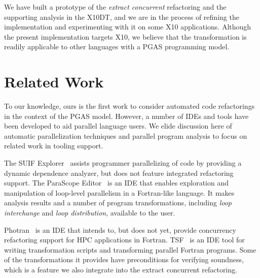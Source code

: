 \documentclass[natbib]{sigplanconf}
\begin{document}
We have built a prototype of the {\em extract concurrent} 
refactoring and the supporting analysis
in the X10DT, and we are in the process of refining the
implementation and experimenting with it on some X10 applications. 
Although the present implementation targets X10, we believe that the
transformation is readily applicable to other languages with a PGAS
programming model.

\section{Related Work}
\label{sec:related}

To our knowledge, ours is the first work to consider automated code
refactorings in the context of the PGAS model.  However,
a number of IDEs and
tools have been developed to aid parallel language users. 
We elide discussion here of automatic parallelization
techniques and parallel program analysis to focus on related work in tooling
support.

The SUIF Explorer~\cite{Liao99} assists programmer parallelizing of
code by providing a dynamic dependence analyzer, but does not feature
integrated refactoring support. The ParaScope Editor~\cite{Kennedy91} is an IDE that
enables exploration and manipulation of
loop-level parallelism in a Fortran-like language. It makes
analysis results and a number of program transformations, including {\em loop
interchange} and {\em loop distribution}, available to the user.

Photran~\cite{Overbey05} is an IDE that intends to, but does not yet, 
provide concurrency refactoring support for HPC applications in Fortran.
TSF~\cite{TSF} is an IDE tool for writing
transformation scripts and transforming parallel Fortran programs. Some of
the transformations it provides have preconditions for verifying soundness,
which is a feature we also integrate into the extract concurrent
refactoring.
\end{document}
